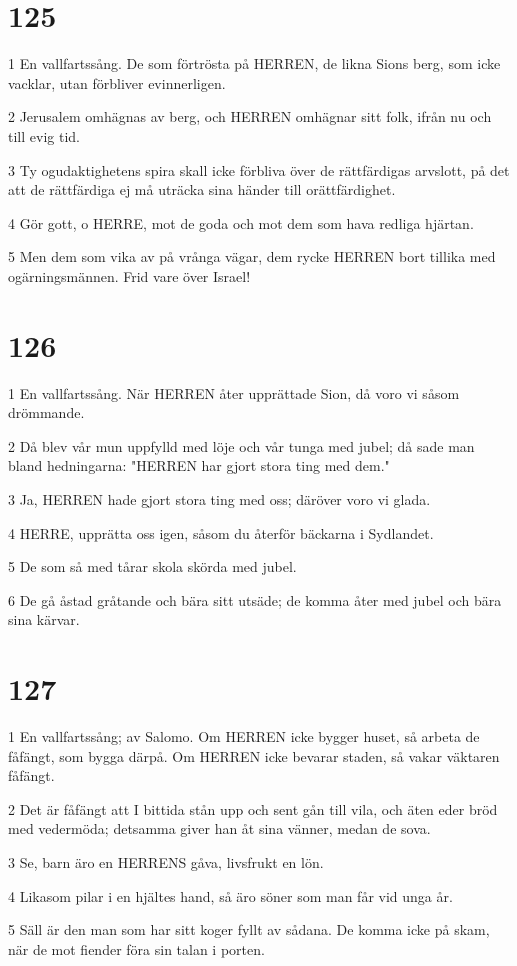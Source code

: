 \chapter{125}

\par 1 En vallfartssång. De som förtrösta på HERREN, de likna Sions berg, som icke vacklar, utan förbliver evinnerligen.
\par 2 Jerusalem omhägnas av berg, och HERREN omhägnar sitt folk, ifrån nu och till evig tid.
\par 3 Ty ogudaktighetens spira skall icke förbliva över de rättfärdigas arvslott, på det att de rättfärdiga ej må uträcka sina händer till orättfärdighet.
\par 4 Gör gott, o HERRE, mot de goda och mot dem som hava redliga hjärtan.
\par 5 Men dem som vika av på vrånga vägar, dem rycke HERREN bort tillika med ogärningsmännen. Frid vare över Israel!

\chapter{126}

\par 1 En vallfartssång. När HERREN åter upprättade Sion, då voro vi såsom drömmande.
\par 2 Då blev vår mun uppfylld med löje och vår tunga med jubel; då sade man bland hedningarna: "HERREN har gjort stora ting med dem."
\par 3 Ja, HERREN hade gjort stora ting med oss; däröver voro vi glada.
\par 4 HERRE, upprätta oss igen, såsom du återför bäckarna i Sydlandet.
\par 5 De som så med tårar skola skörda med jubel.
\par 6 De gå åstad gråtande och bära sitt utsäde; de komma åter med jubel och bära sina kärvar.

\chapter{127}

\par 1 En vallfartssång; av Salomo. Om HERREN icke bygger huset, så arbeta de fåfängt, som bygga därpå. Om HERREN icke bevarar staden, så vakar väktaren fåfängt.
\par 2 Det är fåfängt att I bittida stån upp och sent gån till vila, och äten eder bröd med vedermöda; detsamma giver han åt sina vänner, medan de sova.
\par 3 Se, barn äro en HERRENS gåva, livsfrukt en lön.
\par 4 Likasom pilar i en hjältes hand, så äro söner som man får vid unga år.
\par 5 Säll är den man som har sitt koger fyllt av sådana. De komma icke på skam, när de mot fiender föra sin talan i porten.


